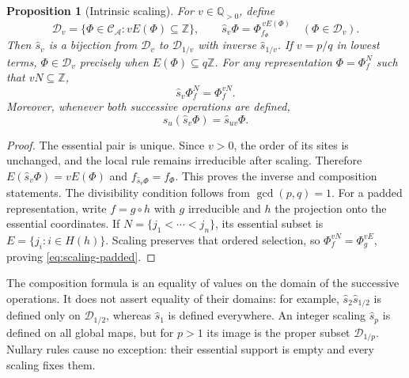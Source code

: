 \documentclass[11pt,a4paper]{article}
\newenvironment{revision}{\color{blue}}{}
\newenvironment{revision}{\color{black}}{}
\newcommand{\locmark}[1]{\label{#1}\linelabel{line:#1}}
\newtheorem{prop}{Proposition}
\begin{document}
\begin{revision}
\begin{prop}[Intrinsic scaling]\label{prop:scaling-domain}
\locmark{loc:scaling-domain}
For $v\in\mathbb Q_{>0}$, define
\[
\mathcal D_v=\{\Phi\in\mathcal C_{\mathcal A}:vE(\Phi)\subseteq\mathbb Z\},
\qquad
\hat s_v\Phi=\Phi_{f_\Phi}^{\,vE(\Phi)}\quad(\Phi\in\mathcal D_v).
\]
Then $\hat s_v$ is a bijection from $\mathcal D_v$ to
$\mathcal D_{1/v}$ with inverse $\hat s_{1/v}$.
If $v=p/q$ in lowest terms, $\Phi\in\mathcal D_v$ precisely when
$E(\Phi)\subseteq q\mathbb Z$.
For any representation $\Phi=\Phi_f^N$ such that $vN\subseteq\mathbb Z$,
\begin{equation}\label{eq:scaling-padded}
\hat s_v\Phi_f^N=\Phi_f^{vN}.
\end{equation}
Moreover, whenever both successive operations are defined,
\begin{equation}\label{eq:scaling-composition}
\hat s_u(\hat s_v\Phi)=\hat s_{uv}\Phi.
\end{equation}
\end{prop}
\begin{proof}
The essential pair is unique. Since $v>0$, the order of its sites is
unchanged, and the local rule remains irreducible after scaling. Therefore
$E(\hat s_v\Phi)=vE(\Phi)$ and
$f_{\hat s_v\Phi}=f_\Phi$. This proves the inverse and composition
statements. The divisibility condition follows from $\gcd(p,q)=1$.
For a padded representation, write $f=g\circ h$ with $g$ irreducible and
$h$ the projection onto the essential coordinates. If
$N=\{j_1<\cdots<j_n\}$, its essential subset is
$E=\{j_i:i\in H(h)\}$. Scaling preserves that ordered selection, so
$\Phi_f^{vN}=\Phi_g^{vE}$, proving
\eqref{eq:scaling-padded}.
\end{proof}
The composition formula is an equality of values on the domain of the
successive operations. It does not assert equality of their domains:
for example, $\hat s_2\hat s_{1/2}$ is defined only on
$\mathcal D_{1/2}$, whereas $\hat s_1$ is defined everywhere.
An integer scaling $\hat s_p$ is defined on all global maps, but for
$p>1$ its image is the proper subset $\mathcal D_{1/p}$.
Nullary rules cause no exception: their essential support is empty and
every scaling fixes them.


\end{revision}
\end{document}

